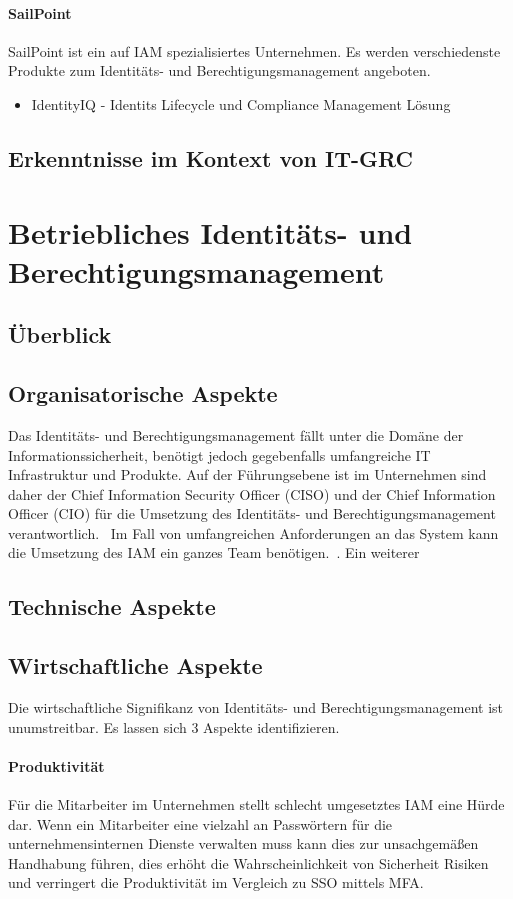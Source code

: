 \documentclass[10pt]{article}
\begin{document}
\paragraph{SailPoint}
SailPoint ist ein auf IAM spezialisiertes Unternehmen. Es werden verschiedenste Produkte zum Identitäts- und Berechtigungsmanagement angeboten.
\begin{itemize}
  \item IdentityIQ - Identits Lifecycle und Compliance Management Lösung
\end{itemize}
\subsection{Erkenntnisse im Kontext von IT-GRC}
\section{Betriebliches Identitäts- und Berechtigungsmanagement}
\label{sec:betrieb}
\subsection{Überblick}
\subsection{Organisatorische Aspekte}
Das Identitäts- und Berechtigungsmanagement fällt unter die Domäne der Informationssicherheit, benötigt jedoch gegebenfalls umfangreiche IT Infrastruktur und Produkte. Auf der Führungsebene ist im Unternehmen sind daher der Chief Information Security Officer (CISO) und der Chief Information Officer (CIO) für die Umsetzung des Identitäts- und Berechtigungsmanagement verantwortlich.~\cite{azhar2014economics}\cite{baldwin2009using} Im Fall von umfangreichen Anforderungen an das System kann die Umsetzung des IAM ein ganzes Team benötigen.~\cite{mohammed2011identity}. Ein weiterer
\subsection{Technische Aspekte}
\subsection{Wirtschaftliche Aspekte}
Die wirtschaftliche Signifikanz von Identitäts- und Berechtigungsmanagement ist unumstreitbar. Es lassen sich 3 Aspekte identifizieren.
\paragraph{Produktivität}
Für die Mitarbeiter im Unternehmen stellt schlecht umgesetztes IAM eine Hürde dar. Wenn ein Mitarbeiter eine vielzahl an Passwörtern für die unternehmensinternen Dienste verwalten muss kann dies zur unsachgemäßen Handhabung führen, dies erhöht die Wahrscheinlichkeit von Sicherheit Risiken und verringert die Produktivität im Vergleich zu SSO mittels MFA.~\cite{azhar2014economics}
\end{document}
